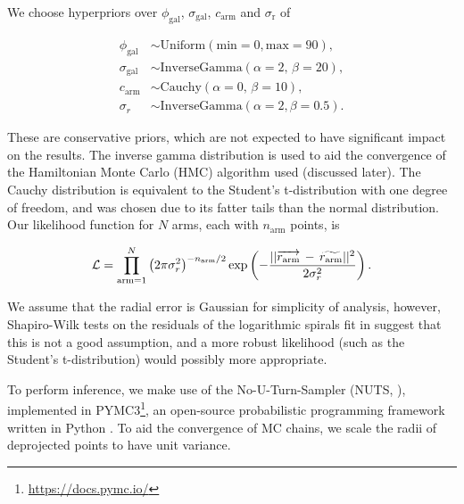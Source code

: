 We choose hyperpriors over $\phi_\mathrm{gal}$, $\sigma_\mathrm{gal}$, $c_\mathrm{arm}$ and $\sigma_\mathrm{r}$ of

\begin{align}
  \phi_\mathrm{gal} &\sim \mathrm{Uniform}(\mathrm{min}=0, \mathrm{max}=90),\\
  \sigma_\mathrm{gal} &\sim \mathrm{InverseGamma}(\alpha=2,\,\beta=20),\\
  c_\mathrm{arm} &\sim \mathrm{Cauchy}(\alpha=0,\,\beta=10),\\
  \sigma_r &\sim \mathrm{InverseGamma}(\alpha=2, \beta=0.5).
\end{align}

These are conservative priors, which are not expected to have significant impact on the results. The inverse gamma distribution is used to aid the convergence of the Hamiltonian Monte Carlo (HMC) algorithm used (discussed later). The Cauchy distribution is equivalent to the Student's t-distribution with one degree of freedom, and was chosen due to its fatter tails than the normal distribution. Our likelihood function for $N$ arms, each with $n_\mathrm{arm}$ points, is

\begin{equation}
  \mathcal{L} = \prod_{\mathrm{arm}=1}^{N}\left(2\pi\sigma_r^2\right)^{-n_\mathrm{arm}/2}
  \exp\left(-\frac{||\overrightarrow{r_\mathrm{arm}}\,-\,\widetilde{r_\mathrm{arm}}||^2}{2\sigma_r^2}\right).
\end{equation}

We assume that the radial error is Gaussian for simplicity of analysis, however, Shapiro-Wilk tests on the residuals of the logarithmic spirals fit in \citet{2020arXiv200610450L} suggest that this is not a good assumption, and a more robust likelihood (such as the Student's t-distribution) would possibly more appropriate.

To perform inference, we make use of the No-U-Turn-Sampler (NUTS, \citealt{2011arXiv1111.4246H}), implemented in PYMC3\footnote{\url{https://docs.pymc.io/}}, an open-source probabilistic programming framework written in Python \citep{pymc3_paper}. To aid the convergence of MC chains, we scale the radii of deprojected points to have unit variance.
